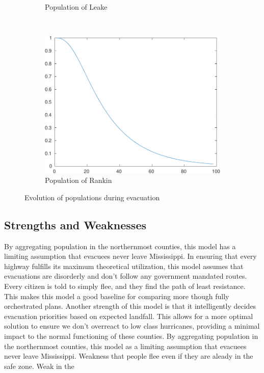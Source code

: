 \documentclass[titlepage]{article}
\begin{document}
\begin{figure}
\begin{subfigure}[b]{0.3\textwidth}
        \caption{Population of Leake}
        \label{fig:pop_county39}
      \end{subfigure}~
      \begin{subfigure}[b]{0.3\textwidth}
        \center
        \includegraphics[width=\textwidth]{figures/pop_county_60-crop.pdf}
        \caption{Population of Rankin}
        \label{fig:pop_county60}
      \end{subfigure}
      \caption{Evolution of populations during evacuation}
      \label{fig:pop_deter}
    \end{figure}

  \subsection{Strengths and Weaknesses}
    By aggregating population in the northernmost counties, this model has a limiting assumption that evacuees never leave Mississippi.
    In ensuring that every highway fulfills its maximum theoretical utilization, this model assumes that evacuations are disorderly and don't follow any government mandated routes. Every citizen is told to simply flee, and they find the path of least resistance. This makes this model a good baseline for comparing more though fully orchestrated plans.
    Another strength of this model is that it intelligently decides evacuation priorities based on expected landfall. This allows for a more optimal solution to ensure we don't overreact to low class hurricanes, providing a minimal impact to the normal functioning of these counties.
    By aggregating population in the northernmost counties, this model as a limiting assumption that evacuees never leave Mississippi.
    Weakness that people flee even if they are aleady in the safe zone.
    Weak in the 
\end{document}
